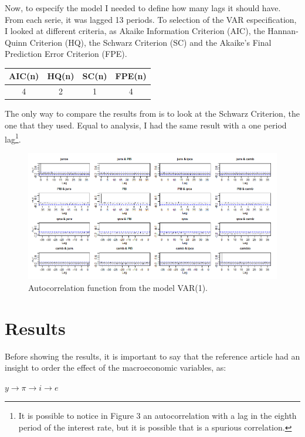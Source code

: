 \documentclass[hidelinks,12pt]{article}
\begin{document}
Now, to especify the model I needed to define how many lags it should have. From each serie, it was lagged 13 periods. To  selection of the VAR especification, I looked at different criteria, as Akaike Information Criterion (AIC), the Hannan-Quinn Criterion (HQ), the Schwarz Criterion (SC) and the Akaike's Final Prediction Error Criterion (FPE).

\begin{table}[H]
	\centering
	\begin{tabular}{|c|c|c|c|}
		\hline
		AIC(n) & HQ(n) & SC(n) & FPE(n) \\ \hline
		4      & 2     & 1     & 4      \\ \hline
	\end{tabular}
\end{table}


The only way to compare the results from \citet{c15} is to look at the Schwarz Criterion, the one that they used. Equal to \citet{c15} analysis, I had the same result with a one period lag\footnote{It is possible to notice in Figure 3 an autocorrelation with a lag in the eighth period of the interest rate, but it is possible that is a spurious correlation.}.

\begin{figure}[H]
	\centering
	\includegraphics[width=0.7\linewidth]{"../2. Dados/Rplot02"}
	\caption{Autocorrelation function from the model VAR(1).}
	\label{fig:rplot02}
\end{figure}
	
	\section{Results}
	
Before showing the results, it is important to say that the reference article had an insight to order the effect of the macroeconomic variables, as:


\begin{center}

$y \rightarrow \pi \rightarrow i \rightarrow e$

\end{center}
\end{document}
